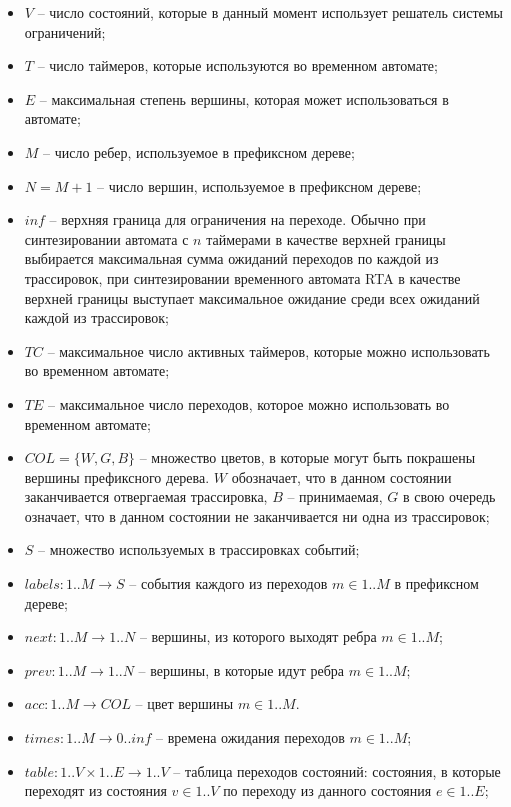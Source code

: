 \documentclass[times,specification,annotation]{itmo-student-thesis}
\begin{document}
\begin{itemize}
  \item $V$ -- число состояний, которые в данный момент использует решатель системы ограничений;
  \item $T$ -- число таймеров, которые используются во временном автомате;
  \item $E$ -- максимальная степень вершины, которая может использоваться в автомате;
  \item $M$ -- число ребер, используемое в префиксном дереве;
  \item $N = M + 1$ -- число вершин, используемое в префиксном дереве;
  \item $inf$ -- верхняя граница для ограничения на переходе. Обычно при синтезировании автомата с $n$ таймерами в качестве верхней границы выбирается максимальная сумма
    ожиданий переходов по каждой из трассировок, при синтезировании временного автомата RTA в качестве верхней границы выступает максимальное ожидание среди всех ожиданий
    каждой из трассировок;
  \item $TC$ -- максимальное число активных таймеров, которые можно использовать во временном автомате;
  \item $TE$ -- максимальное число переходов, которое можно использовать во временном автомате;
  \item $COL = \{ W, G, B \}$ -- множество цветов, в которые могут быть покрашены вершины префиксного дерева. $W$ обозначает, что в данном состоянии заканчивается отвергаемая
    трассировка, $B$ -- принимаемая, $G$ в свою очередь означает, что в данном состоянии не заканчивается ни одна из трассировок;
  \item $S$ -- множество используемых в трассировках событий;
  \item $labels: 1..M \rightarrow S$ -- события каждого из переходов $m \in 1..M$ в префиксном дереве;
  \item $next: 1..M \rightarrow 1..N$ -- вершины, из которого выходят ребра $m \in 1..M$;
  \item $prev: 1..M \rightarrow 1..N$ -- вершины, в которые идут ребра $m \in 1..M$;
  \item $acc: 1..M \rightarrow COL$ -- цвет вершины $m \in 1..M$.
  \item $times: 1..M \rightarrow 0..inf$ -- времена ожидания переходов $m \in 1..M$;
  \item $table: 1..V \times 1..E \rightarrow 1..V$ -- таблица переходов состояний: состояния, в которые переходят из состояния $v \in 1..V$ по переходу из данного состояния $e \in 1..E$;

\end{itemize}
\end{document}
